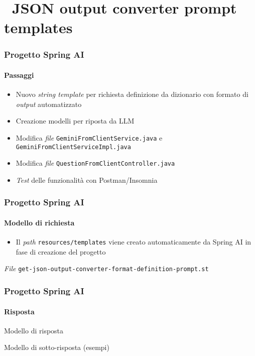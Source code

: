 \section{\faWrench\ JSON output converter prompt templates} %
\label{sec:spring-ai-gemini-json-output-converter-format-prompt-templates}
%
\begin{frame}[t,fragile] \frametitle{Progetto Spring AI}
    \framesubtitle{Passaggi}
	\begin{itemize}[leftmargin=10pt,align=right]
		\item[\alertedcircled{1}] Nuovo \textit{string template} per richiesta definizione da dizionario con formato di \textit{output} automatizzato
		\item[\alertedcircled{2}] Creazione modelli per riposta da LLM
        \item[\alertedcircled{3}] Modifica \textit{file} \texttt{GeminiFromClientService.java} e \texttt{GeminiFromClientServiceImpl.java}
        \item[\alertedcircled{4}] Modifica \textit{file} \texttt{QuestionFromClientController.java}
        \item[\alertedcircled{5}] \textit{Test} delle funzionalità con Postman/Insomnia
	\end{itemize}
\end{frame}
%
\begin{frame}[t,fragile] \frametitle{Progetto Spring AI}
    \framesubtitle{Modello di richiesta}
        \begin{itemize}[leftmargin=10pt,align=right]
		    \item[\alert{\faExclamationTriangle}] Il \textit{path} \texttt{resources/templates} viene creato automaticamente da Spring AI in fase di creazione del progetto
        \end{itemize}
        \begin{block}{\textit{File} \texttt{get-json-output-converter-format-definition-prompt.st}}
			{\scriptsize}
    	\end{block}
\end{frame}
%
\begin{frame}[t,fragile] \frametitle{Progetto Spring AI}
    \framesubtitle{Risposta}
        \begin{block}{Modello di risposta}
			{\tiny}
    	\end{block}
        \begin{block}{Modello di sotto-risposta (esempi)}
			{\scriptsize}
    	\end{block}
\end{frame}
